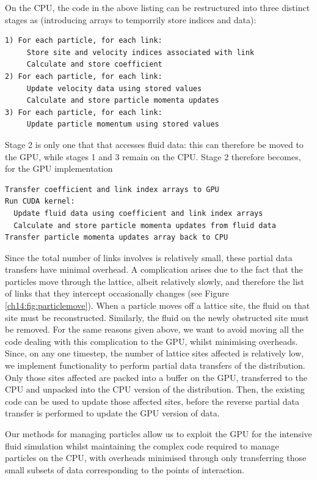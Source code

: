 On the CPU, the code in the above listing can be restructured into
three distinct stages as (introducing arrays to temporrily store
indices and data):
{\footnotesize
\begin{verbatim}
1) For each particle, for each link:
     Store site and velocity indices associated with link
     Calculate and store coefficient
2) For each particle, for each link:
     Update velocity data using stored values
     Calculate and store particle momenta updates
3) For each particle, for each link:
     Update particle momentum using stored values
\end{verbatim}
}
Stage 2 is only one that that accesses fluid data: this can therefore
be moved to the GPU, while stages 1 and 3 remain on the CPU. Stage 2
therefore becomes, for the GPU implementation
{\footnotesize
\begin{verbatim}
Transfer coefficient and link index arrays to GPU
Run CUDA kernel:
  Update fluid data using coefficient and link index arrays
  Calculate and store particle momenta updates from fluid data
Transfer particle momenta updates array back to CPU
\end{verbatim}
}
Since the total number of links involves is relatively small, these
partial data transfers have minimal overhead.  A complication arises
due to the fact that the particles move through the lattice, albeit
relatively slowly, and therefore the list of links that they intercept
occasionally changes (see Figure \ref{ch14:fig:particlemove}).  When a
particle moves off a lattice site, the fluid on that site must be
reconstructed. Similarly, the fluid on the newly obstructed site must
be removed. For the same reasons given above, we want to avoid moving
all the code dealing with this complication to the GPU, whilst
minimising overheads. Since, on any one timestep, the number of
lattice sites affected is relatively low, we implement functionality
to perform partial data transfers of the distribution. Only those
sites affected are packed into a buffer on the GPU, transferred to the
CPU and unpacked into the CPU version of the distribution. Then, the
existing code can be used to update those affected sites, before the
reverse partial data transfer is performed to update the GPU version
of data.

Our methods for managing particles allow us to exploit the GPU for the
intensive fluid simulation whilst maintaining the complex code
required to manage particles on the CPU, with overheads minimised
through only transferring those small subsets of data corresponding to
the points of interaction.



